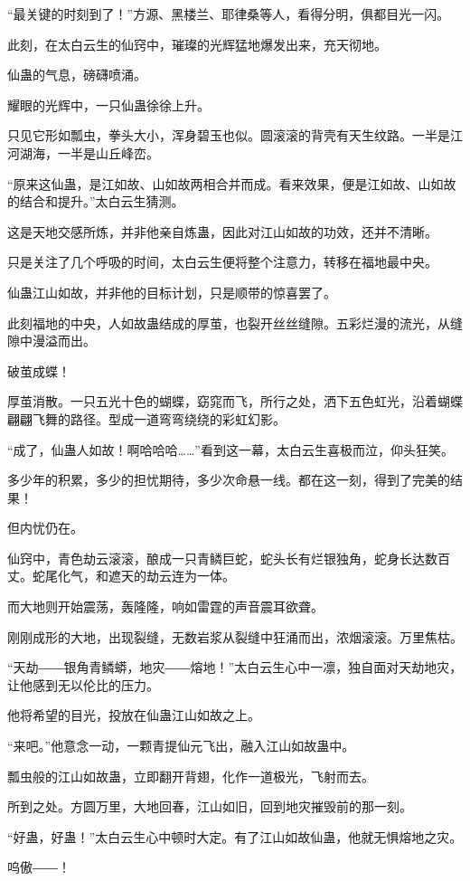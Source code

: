 \begin{this_body}
“最关键的时刻到了！”方源、黑楼兰、耶律桑等人，看得分明，俱都目光一闪。

此刻，在太白云生的仙窍中，璀璨的光辉猛地爆发出来，充天彻地。

仙蛊的气息，磅礴喷涌。

耀眼的光辉中，一只仙蛊徐徐上升。

只见它形如瓢虫，拳头大小，浑身碧玉也似。圆滚滚的背壳有天生纹路。一半是江河湖海，一半是山丘峰峦。

“原来这仙蛊，是江如故、山如故两相合并而成。看来效果，便是江如故、山如故的结合和提升。”太白云生猜测。

这是天地交感所炼，并非他亲自炼蛊，因此对江山如故的功效，还并不清晰。

只是关注了几个呼吸的时间，太白云生便将整个注意力，转移在福地最中央。

仙蛊江山如故，并非他的目标计划，只是顺带的惊喜罢了。

此刻福地的中央，人如故蛊结成的厚茧，也裂开丝丝缝隙。五彩烂漫的流光，从缝隙中漫溢而出。

破茧成蝶！

厚茧消散。一只五光十色的蝴蝶，窈窕而飞，所行之处，洒下五色虹光，沿着蝴蝶翩翩飞舞的路径。型成一道弯弯绕绕的彩虹幻影。

“成了，仙蛊人如故！啊哈哈哈……”看到这一幕，太白云生喜极而泣，仰头狂笑。

多少年的积累，多少的担忧期待，多少次命悬一线。都在这一刻，得到了完美的结果！

但内忧仍在。

仙窍中，青色劫云滚滚，酿成一只青鳞巨蛇，蛇头长有烂银独角，蛇身长达数百丈。蛇尾化气，和遮天的劫云连为一体。

而大地则开始震荡，轰隆隆，响如雷霆的声音震耳欲聋。

刚刚成形的大地，出现裂缝，无数岩浆从裂缝中狂涌而出，浓烟滚滚。万里焦枯。

“天劫――银角青鳞蟒，地灾――熔地！”太白云生心中一凛，独自面对天劫地灾，让他感到无以伦比的压力。

他将希望的目光，投放在仙蛊江山如故之上。

“来吧。”他意念一动，一颗青提仙元飞出，融入江山如故蛊中。

瓢虫般的江山如故蛊，立即翻开背翅，化作一道极光，飞射而去。

所到之处。方圆万里，大地回春，江山如旧，回到地灾摧毁前的那一刻。

“好蛊，好蛊！”太白云生心中顿时大定。有了江山如故仙蛊，他就无惧熔地之灾。

呜傲――！


\end{this_body}
